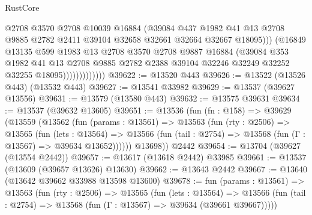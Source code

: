 \begin{lexlean}{RustCore}
\begin{coremodule}
                              @2708
                              @3570
                              @2708
                              @10039
                              @16884
                              (@39084
                                @437
                                @1982
                                @41
                                @13
                                @2708
                                @9885
                                @2782
                                @2411
                                @39104
                                @32658
                                @32661
                                @32664
                                @32667
                                @18095)))
                          (@16849
                            @13135
                            @599
                            @1983
                            @13
                            @2708
                            @3570
                            @2708
                            @9887
                            @16884
                            (@39084
                              @353
                              @1982
                              @41
                              @13
                              @2708
                              @9885
                              @2782
                              @2388
                              @39104
                              @32246
                              @32249
                              @32252
                              @32255
                              @18095)))))))))))))
@39622 := @13520 @443
@39626 := @13522 (@13526 @443) (@13532 @443)
@39627 := @13541 @33982
@39629 := @13537 (@39627 @13556)
@39631 := @13579 (@13580 @443)
@39632 := @13575 @39631
@39634 := @13537 (@39632 @13605)
@39651 := @13536
    (fun (fn : @158) =>
    @39629
      (@13559
        (@13562
          (fun (params : @13561) =>
          @13563
            (fun (rty : @2506) =>
            @13565
              (fun (lets : @13564) =>
              @13566 (fun (tail : @2754) => @13568 (fun (Γ : @13567) => @39634 @13652))))))
        @13698))
    @2442
@39654 := @13704 (@39627 (@13554 @2442))
@39657 := @13617 (@13618 @2442) @33985
@39661 := @13537 (@13609 (@39657 @13626) @13630)
@39662 := @13643 @2442
@39667 := @13640 (@13642 @39662 @33988 @13598 @13600)
@39678 := fun (params : @13561) =>
  @13563
    (fun (rty : @2506) =>
    @13565
      (fun (lets : @13564) =>
      @13566 (fun (tail : @2754) => @13568 (fun (Γ : @13567) => @39634 (@39661 @39667)))))

\end{coremodule}
\end{lexlean}
